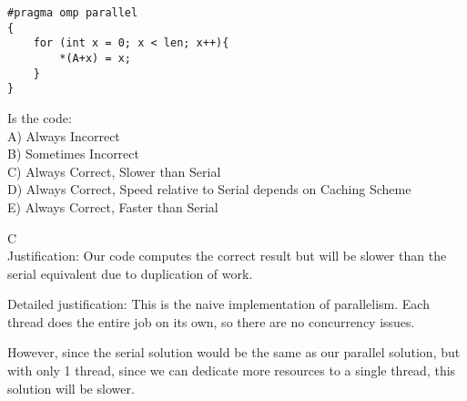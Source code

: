 \begin{blocksection}

\question
\begin{verbatim}
#pragma omp parallel 
{ 
    for (int x = 0; x < len; x++){ 
        *(A+x) = x; 
    } 
}   
\end{verbatim}

Is the code: \\
A) Always Incorrect \\
B) Sometimes Incorrect \\ 
C) Always Correct, Slower than Serial \\
D) Always Correct, Speed relative to Serial depends on Caching Scheme \\
E) Always Correct, Faster than Serial \\

\begin{solution}[0.5in]
C\\
Justification: 
Our code computes the correct result but will be slower than the serial equivalent due to duplication of work. 

Detailed justification:
This is the naive implementation of parallelism. Each thread does the entire job on its own, so there are no concurrency issues. 

However, since the serial solution would be the same as our parallel solution, but with only 1 thread, since we can dedicate more resources to a single thread, this solution will be slower.
\end{solution}
\end{blocksection}